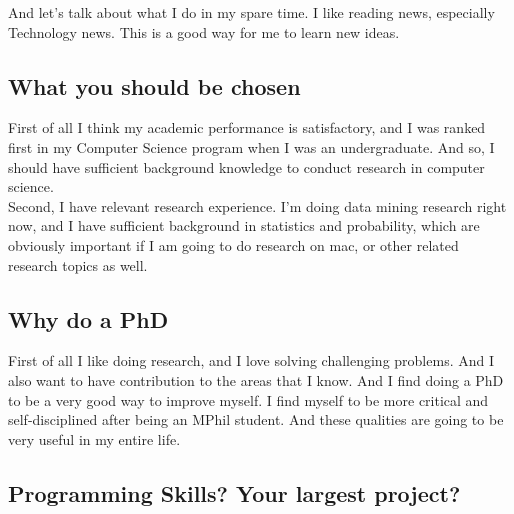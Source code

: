 \documentclass[12pt, landscape]{article}
\begin{document}
\begin{multicols}{2}
And let's talk about what I do in my spare time. I like reading news, especially Technology news. This is a good way for me to learn new ideas.\\

\subsection{What you should be chosen}

 First of all I think my academic performance is satisfactory, and I was ranked first in my Computer Science program when I was an undergraduate. And so, I should have sufficient background knowledge to conduct research in computer science.\\
 
 Second, I have relevant research experience. I'm doing data mining research right now, and I have sufficient background in statistics and probability, which are obviously important if I am going to do research on mac, or other related research topics as well. 
 \subsection{Why do a PhD}
 First of all I like doing research, and I love solving challenging problems. And I also want to have contribution to the areas that I know. And I find doing a PhD to be a very good way to improve myself. I find myself to be more critical and self-disciplined after being an MPhil student. And these qualities are going to be very useful in my entire life. 
 \subsection{Programming Skills? Your largest project?}
 

\end{multicols}
\end{document}
